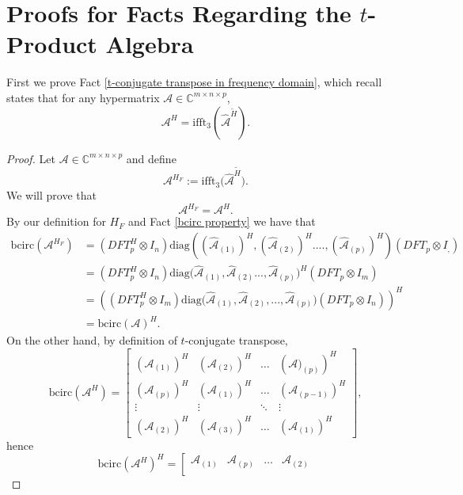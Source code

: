 \documentclass[11pt]{article}
\begin{document}
\section{Proofs for Facts Regarding the $t$-Product Algebra}
First we prove Fact \ref{t-conjugate transpose in frequency domain}, which recall states that for any hypermatrix $\mathcal{A}\in \mathbb{C}^{m\times n\times p}$, 
\[\mathcal{A}^H = \mathrm{ifft}_3\left(\widehat{\mathcal{A}}^{\widetilde{H}}\right).\]
\begin{proof}
    Let $\mathcal{A}\in \mathbb{C}^{m\times n\times p}$ and define 
    \[\mathcal{A}^{H_F} := \mathrm{ifft}_3\Big(\widehat{\mathcal{A}}^{\widetilde{H}}\Big).\]
    We will prove that 
    \[\mathcal{A}^{H_F} = \mathcal{A}^H.\]
    By our definition for $H_F$ and Fact \ref{bcirc property} we have that 
    \begin{align*}
        \mathrm{bcirc}(\mathcal{A}^{H_F}) &= (DFT_p^H\otimes I_n)\mathrm{diag}\left(\left(\widehat{\mathcal{A}}_{(1)}\right)^H,\left(\widehat{\mathcal{A}}_{(2)}\right)^H....,\left(\widehat{\mathcal{A}}_{(p)}\right)^H\right)(DFT_p\otimes I_,) \\
        &= (DFT_p^H\otimes I_n)\mathrm{diag}\big(\widehat{\mathcal{A}}_{(1)},\widehat{\mathcal{A}}_{(2)}...,\widehat{\mathcal{A}}_{(p)}\big)^H(DFT_p\otimes I_m) \\
        &= \left((DFT_p^H\otimes I_m)\mathrm{diag}\big(\widehat{\mathcal{A}}_{(1)},\widehat{\mathcal{A}}_{(2)},...,\widehat{\mathcal{A}}_{(p)}\big)(DFT_p\otimes I_n)\right)^H \\
        &= \mathrm{bcirc}(\mathcal{A})^H.
    \end{align*}
    On the other hand, by definition of $t$-conjugate transpose, 
    \[\mathrm{bcirc}(\mathcal{A}^H) = \left[\begin{array}{cccc}
        \left(\mathcal{A}_{(1)}\right)^H & \left(\mathcal{A}_{(2)}\right)^H & \dots & \left(\mathcal{A})_{(p)}\right)^H \\
        \left(\mathcal{A}_{(p)}\right)^H & \left(\mathcal{A}_{(1)}\right)^H & \dots & \left(\mathcal{A}_{(p-1)}\right)^H \\
        \vdots & \vdots & \ddots & \vdots \\
        \left(\mathcal{A}_{(2)}\right)^H & \left(\mathcal{A}_{(3)}\right)^H & \dots & \left(\mathcal{A}_{(1)}\right)^H
    \end{array}\right],\]
    hence 
    \[\mathrm{bcirc}(\mathcal{A}^H)^H = \left[\begin{array}{cccc}
        \mathcal{A}_{(1)} & \mathcal{A}_{(p)} & \dots & \mathcal{A}_{(2)} \\

\end{array}\]
\end{proof}
\end{document}
